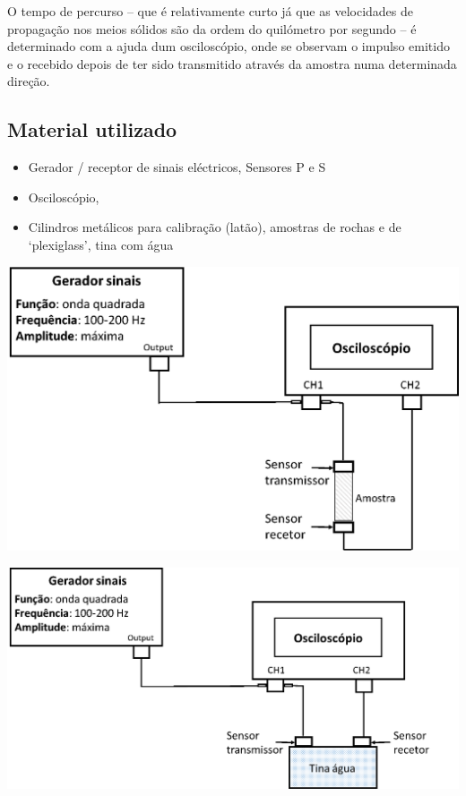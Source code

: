 \documentclass[a4paper,12pt]{article}
\begin{document}
O tempo de percurso -- que é relativamente curto já que as velocidades de propagação nos meios sólidos são da ordem do quilómetro por segundo -- é determinado com a ajuda dum osciloscópio, onde se observam o impulso emitido e o recebido depois de ter sido transmitido através da amostra numa determinada direção. 

\subsection{\sf Material utilizado}
\begin{itemize}
\item Gerador / receptor de sinais eléctricos, Sensores P e S
\item Osciloscópio,
\item Cilindros metálicos para calibração (latão), amostras de rochas e de ‘plexiglass’, tina com água
\end{itemize}

\noindent\begin{minipage}[c]{0.5\textwidth}
\centering
	\includegraphics[width=0.9\linewidth]{esquema_amostra}
\end{minipage}
\begin{minipage}[c]{0.5\textwidth}
\begin{center}
	\includegraphics[width=0.7\linewidth]{esquema_tina}
\end{center}
\end{minipage}
\end{document}

